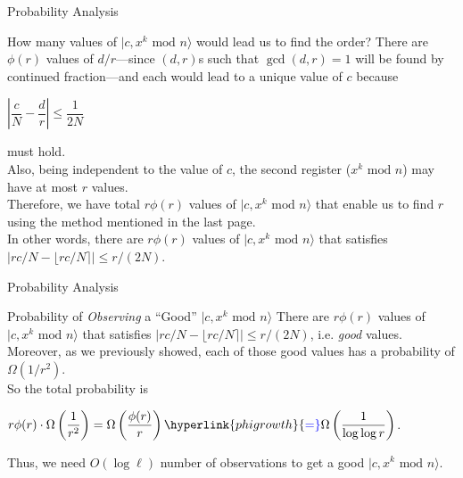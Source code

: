 \documentclass{beamer}
\renewcommand{\:}{\text{ }}
\renewcommand{\mod}{\text{ mod }}
\begin{document}
    \begin{frame}{Probability Analysis}
        \begin{block}{How many values of $\vert c, x^k \mod n \rangle$ would lead us to find the order?}
            \small
            There are $\phi(r)$ values of $d/r$---since $(d, r)$s such that $\gcd(d,r)=1$ will be found by continued fraction---and
            each would lead to a unique value of $c$ because \\[.5em]
            \centerline{$\left| \dfrac{c}{N} - \dfrac{d}{r} \right| \leq \dfrac{1}{2N}$} \vspace*{.em}
            must hold. \\[.5em]
            Also, being independent to the value of $c$, the second register ($x^k \mod n$) may have at most $r$ values. \\[.5em]
            Therefore, we have total $r \phi(r)$ values of $\vert c, x^k \mod n \rangle$ that enable us to find $r$
            using the method mentioned in the last page. \\[.5em]
            In other words, there are $r \phi(r)$ values of $\vert c, x^k \mod n \rangle$ that satisfies $\big| rc/N - \lfloor rc/N \rceil \big| \leq r/(2N)$.
        \end{block}
    \end{frame}

    \begin{frame}{Probability Analysis}
        \begin{block}{Probability of \textit{Observing} a ``Good'' $\vert c, x^k \mod n \rangle$}
            \small
            There are $r \phi(r)$ values of $\vert c, x^k \mod n \rangle$ that satisfies $\big| rc/N - \lfloor rc/N \rceil \big| \leq r/(2N)$, i.e. \textit{good} values. \\[.5em]
            Moreover, as we previously showed, each of those good values has a probability of $\Omega(1/r^2)$. \\[.5em]
            So the total probability is \\[.5em]
            \centerline{$\displaystyle r \phi(r) \cdot \Omega\left( \frac{1}{r^2} \right) = \Omega\left( \frac{\phi(r)}{r} \right) \hyperlink{phigrowth}{\color{blue}=} \Omega\left( \frac{1}{\log \log r} \right)$.} \vspace*{.5em}
            Thus, we need $O(\log \ell)$ number of observations to get a good $\vert c, x^k \mod n \rangle$.
        \end{block}
    \end{frame}
\end{document}
